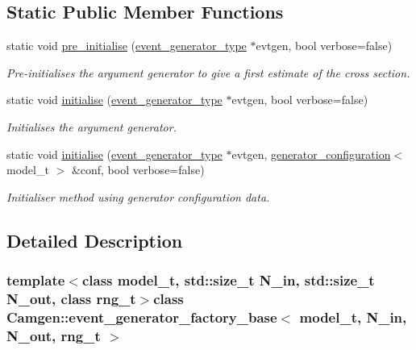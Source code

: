 \subsection*{Static Public Member Functions}
\begin{DoxyCompactItemize}
\item 
static void \hyperlink{a00214_a599f6055f310eb8f889f6ebc9813fd75}{pre\+\_\+initialise} (\hyperlink{a00212}{event\+\_\+generator\+\_\+type} $\ast$evtgen, bool verbose=false)
\begin{DoxyCompactList}\small\item\em Pre-\/initialises the argument generator to give a first estimate of the cross section. \end{DoxyCompactList}\item 
\hypertarget{a00214_a926341329a43097d1f22f4093dc68b06}{}static void \hyperlink{a00214_a926341329a43097d1f22f4093dc68b06}{initialise} (\hyperlink{a00212}{event\+\_\+generator\+\_\+type} $\ast$evtgen, bool verbose=false)\label{a00214_a926341329a43097d1f22f4093dc68b06}

\begin{DoxyCompactList}\small\item\em Initialises the argument generator. \end{DoxyCompactList}\item 
\hypertarget{a00214_ab7dec611d38279a3ccf77eea6342b206}{}static void \hyperlink{a00214_ab7dec611d38279a3ccf77eea6342b206}{initialise} (\hyperlink{a00212}{event\+\_\+generator\+\_\+type} $\ast$evtgen, \hyperlink{a00241}{generator\+\_\+configuration}$<$ model\+\_\+t $>$ \&conf, bool verbose=false)\label{a00214_ab7dec611d38279a3ccf77eea6342b206}

\begin{DoxyCompactList}\small\item\em Initialiser method using generator configuration data. \end{DoxyCompactList}\end{DoxyCompactItemize}


\subsection{Detailed Description}
\subsubsection*{template$<$class model\+\_\+t, std\+::size\+\_\+t N\+\_\+in, std\+::size\+\_\+t N\+\_\+out, class rng\+\_\+t$>$class Camgen\+::event\+\_\+generator\+\_\+factory\+\_\+base$<$ model\+\_\+t, N\+\_\+in, N\+\_\+out, rng\+\_\+t $>$}

